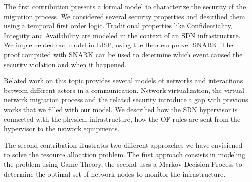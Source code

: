 The first contribution presents a formal model to characterize the security of the migration process. We considered several security properties and described them using a temporal first order logic. Traditional properties like Confidentiality, Integrity and Availability are modeled in the context of an SDN infrastructure.
We implemented our model in LISP, using the theorem prover SNARK.
The proof computed with SNARK can be used to determine which event caused the security violation and when it happened.

Related work on this topic provides several models of networks and interactions between different actors in a communication. Network virtualization, the virtual network migration process and the related security introduce a gap with previous works that we filled with our model. We described how the SDN hypervisor is connected with the physical infrastructure, how the OF rules are sent from the hypervisor to the network equipments. 

The second contribution illustrates two different approaches we have envisioned to solve the resource allocation problem. The first approach consists in modeling the problem using Game Theory, the second uses a Markov Decision Process to determine the optimal set of network nodes to monitor the infrastructure.


